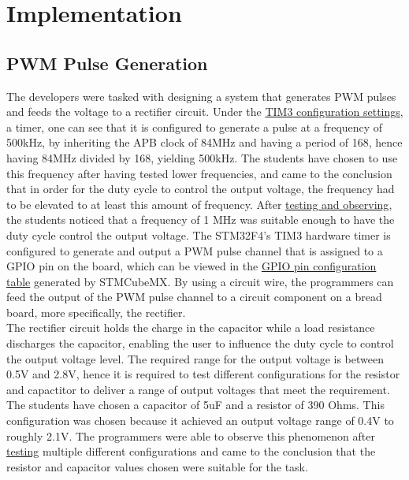 \documentclass[12pt]{report}
\begin{document}
\section{Implementation}

\subsection{PWM Pulse Generation}
The developers were tasked with designing a system that generates PWM pulses and feeds the voltage
to a rectifier circuit. Under the \hyperref[appendixtim2]{TIM3 configuration settings}, a timer, one
can see that it is configured to generate a pulse at a frequency of 500kHz, by inheriting the APB
clock of 84MHz and having a period of 168, hence having 84MHz divided by 168, yielding 500kHz. The students have chosen to use this frequency after having tested lower frequencies, and came to the conclusion that in order for the duty cycle to control the output voltage, the frequency had to be elevated to at least this amount of frequency. After \hyperref[testpwm]{testing and observing}, the students noticed that a frequency of 1 MHz was suitable enough to have the duty cycle control the output voltage. The STM32F4's TIM3 hardware timer is configured to generate and output a PWM pulse channel that is assigned to a GPIO pin on the board, which can be viewed in the \hyperref[pinconfig]{GPIO pin configuration table} generated by STMCubeMX. By using a circuit wire, the programmers can feed the output of the PWM pulse channel to a circuit component on a bread board, more specifically, the rectifier.\\
The rectifier circuit holds the charge in the capacitor while a load resistance discharges the capacitor, enabling the user to influence the duty cycle to control the output voltage level. The required range for the output voltage is between 0.5V and 2.8V, hence it is required to test different configurations for the resistor and capactitor to deliver a range of output voltages that meet the requirement. The students have chosen a capacitor of 5uF and a resistor of 390 Ohms. This configuration was chosen because it achieved an output voltage range of 0.4V to roughly 2.1V. The programmers were able to observe this phenomenon after \hyperref[testpwm]{testing} multiple different configurations and came to the conclusion that the resistor and capacitor values chosen were suitable for the task.
\end{document}
